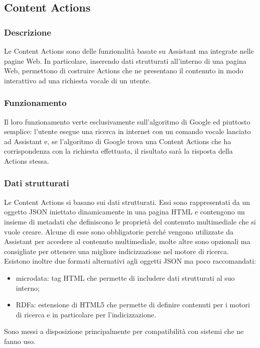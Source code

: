 	\subsection{Content Actions}
		\subsubsection{Descrizione}
		Le Content Actions sono delle funzionalità basate su Assistant ma integrate nelle pagine Web. In particolare, inserendo dati strutturati all'interno di una pagina Web, permettono di costruire Actions che ne presentano il contenuto in modo interattivo ad una richiesta vocale di un utente.
		\subsubsection{Funzionamento}
		Il loro funzionamento verte esclusivamente sull'algoritmo di Google ed piuttosto semplice: l'utente esegue una ricerca in internet con un comando vocale lanciato ad Assistant e, se l'algoritmo di Google trova una Content Actions che ha corrispondenza con la richiesta effettuata, il risultato sarà la risposta della Actions stessa.
		\subsubsection{Dati strutturati}
		Le Content Actions si basano sui dati strutturati. Essi sono rappresentati da un oggetto JSON iniettato dinamicamente in una pagina HTML e contengono un insieme di metadati che definiscono le proprietà del contenuto multimediale che si vuole creare. Alcune di esse sono obbligatorie perché vengono utilizzate da Assistant per accedere al contenuto multimediale, molte altre sono opzionali ma consigliate per ottenere una migliore indicizzazione nel motore di ricerca. \\
		Esistono inoltre due formati alternativi agli oggetti JSON ma poco raccomandati:
		\begin{itemize}
			\item microdata: tag HTML che permette di includere dati strutturati al suo interno;
			\item RDFa: estensione di HTML5 che permette di definire contenuti per i motori di ricerca e in particolare per l'indicizzazione.
		\end{itemize}
		Sono messi a disposizione principalmente per compatibilità con sistemi che ne fanno uso.

